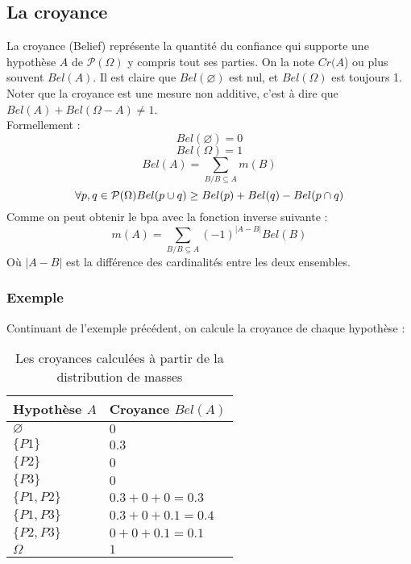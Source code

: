 \subsection{La croyance}

La croyance (Belief) représente la quantité du confiance qui supporte une hypothèse $A$ de 
$\mathcal{P}(\Omega)$ y compris tout ses parties. On la note $Cr(A$) ou plus souvent $Bel(A)$. Il est
claire que $Bel(\varnothing)$ est nul, et $Bel(\Omega)$ est toujours 1. Noter que la croyance est une
mesure non additive, c’est à dire que $Bel(A) + Bel(\Omega - A) \neq 1$.\\
Formellement :
\begin{equation}
Bel(\varnothing)=0
\end{equation}
\begin{equation}
Bel(\Omega)=1
\end{equation}
\begin{equation}
Bel(A) = \sum_{B \slash B \subseteq A} m(B)
\end{equation}
\begin{equation}
\forall p,q \in \mathcal{P}(\Omega) \medskip Bel(p \cup q) \geq Bel(p) + Bel(q) - Bel(p \cap q)
\end{equation}
Comme on peut obtenir le bpa avec la fonction inverse suivante :
\begin{equation}
m(A) = \sum_{B \slash B \subseteq A} (-1)^{|A-B|} Bel(B)
\end{equation}
Où $|A-B|$ est la différence des cardinalités entre les deux ensembles.

\subsubsection{Exemple}
Continuant de l'exemple précédent, on calcule la croyance de chaque hypothèse :

\begin{table}[ht]
\begin{center}
\begin{tabular}{|l|l|}
\hline
Hypothèse $A$ & Croyance $Bel(A)$\\
\hline
$\varnothing$ & $0$ \\
\hline
$\{P1\}$ & $0.3$ \\
\hline
$\{P2\}$ & $0$ \\
\hline
$\{P3\}$ & $0$ \\
\hline
$\{P1, P2\}$ & $0.3 + 0 + 0 = 0.3$ \\
\hline
$\{P1, P3\}$ & $0.3 + 0 + 0.1 = 0.4$ \\
\hline
$\{P2, P3\}$ & $0 + 0 + 0.1 = 0.1$ \\
\hline
$\Omega$ & $1$ \\
\hline
\end{tabular}
\caption{Les croyances calculées à partir de la distribution de masses}
\end{center}
\end{table}

